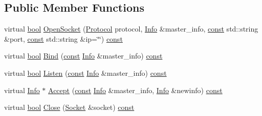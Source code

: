 \subsection*{Public Member Functions}
\begin{DoxyCompactItemize}
\item 
virtual \hyperlink{term__entry_8h_a002004ba5d663f149f6c38064926abac}{bool} \hyperlink{classbpt_1_1_net_abs_1_1_net_unix_a5d2d121e83ff058f5ee521d8a81d3992}{Open\-Socket} (\hyperlink{classbpt_1_1_net_abs_1_1_i_net_access_a4464fb7197d6a70c84c93aadaae560f6}{Protocol} protocol, \hyperlink{classbpt_1_1_net_abs_1_1_i_net_access_1_1_info}{Info} \&master\-\_\-info, \hyperlink{term__entry_8h_a57bd63ce7f9a353488880e3de6692d5a}{const} std\-::string \&port, \hyperlink{term__entry_8h_a57bd63ce7f9a353488880e3de6692d5a}{const} std\-::string \&ip=\char`\"{}\char`\"{}) \hyperlink{term__entry_8h_a57bd63ce7f9a353488880e3de6692d5a}{const} 
\item 
virtual \hyperlink{term__entry_8h_a002004ba5d663f149f6c38064926abac}{bool} \hyperlink{classbpt_1_1_net_abs_1_1_net_unix_a81684ad7585728b70476d884d0aa5efb}{Bind} (\hyperlink{term__entry_8h_a57bd63ce7f9a353488880e3de6692d5a}{const} \hyperlink{classbpt_1_1_net_abs_1_1_i_net_access_1_1_info}{Info} \&master\-\_\-info) \hyperlink{term__entry_8h_a57bd63ce7f9a353488880e3de6692d5a}{const} 
\item 
virtual \hyperlink{term__entry_8h_a002004ba5d663f149f6c38064926abac}{bool} \hyperlink{classbpt_1_1_net_abs_1_1_net_unix_a3438a35a8da8354c6cb26e3c80886248}{Listen} (\hyperlink{term__entry_8h_a57bd63ce7f9a353488880e3de6692d5a}{const} \hyperlink{classbpt_1_1_net_abs_1_1_i_net_access_1_1_info}{Info} \&master\-\_\-info) \hyperlink{term__entry_8h_a57bd63ce7f9a353488880e3de6692d5a}{const} 
\item 
virtual \hyperlink{classbpt_1_1_net_abs_1_1_i_net_access_1_1_info}{Info} $\ast$ \hyperlink{classbpt_1_1_net_abs_1_1_net_unix_a7349321957d773a3402e102a26cb5745}{Accept} (\hyperlink{term__entry_8h_a57bd63ce7f9a353488880e3de6692d5a}{const} \hyperlink{classbpt_1_1_net_abs_1_1_i_net_access_1_1_info}{Info} \&master\-\_\-info, \hyperlink{classbpt_1_1_net_abs_1_1_i_net_access_1_1_info}{Info} \&newinfo) \hyperlink{term__entry_8h_a57bd63ce7f9a353488880e3de6692d5a}{const} 
\item 
virtual \hyperlink{term__entry_8h_a002004ba5d663f149f6c38064926abac}{bool} \hyperlink{classbpt_1_1_net_abs_1_1_net_unix_a133e0a7dd782f2ca9a3df8914dc4ec71}{Close} (\hyperlink{classbpt_1_1_net_abs_1_1_i_net_access_ae5a8cad46f8006b85b535f126b697efc}{Socket} \&socket) \hyperlink{term__entry_8h_a57bd63ce7f9a353488880e3de6692d5a}{const} 

\end{DoxyCompactItemize}
